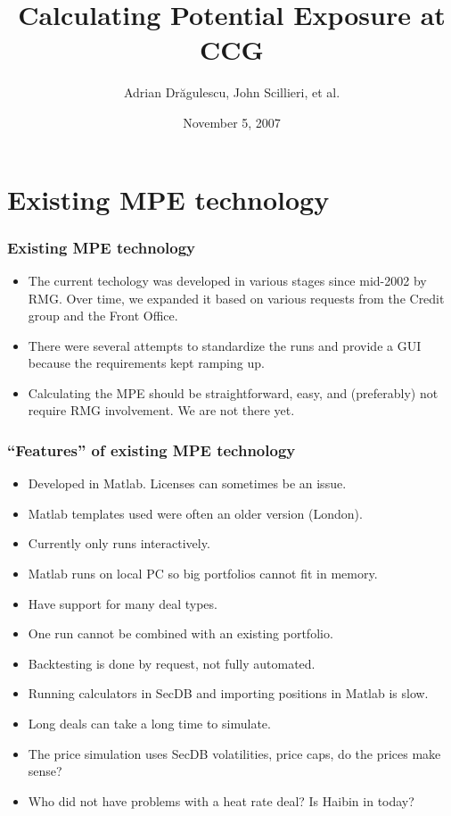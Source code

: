 \documentclass[10pt]{beamer}
\title{Calculating Potential Exposure at CCG}
\author{Adrian Dr\u{a}gulescu, John Scillieri, et al.}
\date{November 5, 2007}
\institute{Risk Management Group\\
Constellation Energy}
\begin{document}
\frame{\titlepage}


\section{Existing MPE technology}

\frame
{
  \frametitle{Existing MPE technology}
\begin{itemize}
\item The current techology was developed in various stages since mid-2002
by RMG.  Over time, we expanded it based on various requests
from the Credit group and the Front Office. 

\item There were several attempts to standardize the runs and provide
  a GUI because the requirements kept ramping up.  

\item Calculating the MPE should be straightforward, easy, and (preferably) 
not require RMG involvement.  We are not there yet.  
\end{itemize}
}

\frame
{
  \frametitle{``Features'' of existing MPE technology}
\begin{itemize}
\item Developed in Matlab.  Licenses can sometimes be an issue. 
\item Matlab templates used were often an older version (London). 
\item Currently only runs interactively. 
\item Matlab runs on local PC so big portfolios cannot fit in memory. 
\item Have support for many deal types.
\item One run cannot be combined with an existing portfolio. 
\item Backtesting is done by request, not fully automated.
\item Running calculators in SecDB and importing positions in Matlab
  is slow. 
\item Long deals can take a long time to simulate.
\item The price simulation uses SecDB volatilities, price caps, do the
  prices make sense? 
\item Who did not have problems with a heat rate deal?  Is Haibin in
  today?  
\end{itemize}
}
\end{document}
